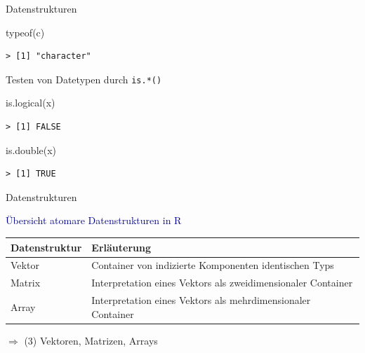 \documentclass[
  8pt,
  ignorenonframetext,
]{beamer}
\newenvironment{Shaded}{\begin{snugshade}}{\end{snugshade}}
\newcommand{\FunctionTok}[1]{\textcolor[rgb]{0.00,0.00,0.00}{#1}}
\newcommand{\NormalTok}[1]{#1}
\begin{document}
\begin{frame}[fragile]{Datenstrukturen}
\begin{Shaded}
\begin{Highlighting}[]
\FunctionTok{typeof}\NormalTok{(c)}
\end{Highlighting}
\end{Shaded}

\begin{verbatim}
> [1] "character"
\end{verbatim}

Testen von Datetypen durch \texttt{is.*()} \vspace{1mm}

\begin{Shaded}
\begin{Highlighting}[]
\FunctionTok{is.logical}\NormalTok{(x)}
\end{Highlighting}
\end{Shaded}

\begin{verbatim}
> [1] FALSE
\end{verbatim}

\begin{Shaded}
\begin{Highlighting}[]
\FunctionTok{is.double}\NormalTok{(x)}
\end{Highlighting}
\end{Shaded}

\begin{verbatim}
> [1] TRUE
\end{verbatim}
\end{frame}

\begin{frame}{Datenstrukturen}
\protect\hypertarget{datenstrukturen-6}{}

\textcolor{darkblue}{Übersicht atomare Datenstrukturen in R}
\vspace{3mm}

\begin{center}
\begin{tabular}{l|l}
Datenstruktur
& Erläuterung
\\\hline

Vektor
& Container von indizierte Komponenten identischen Typs
\\

Matrix
& Interpretation eines Vektors als zweidimensionaler Container
\\

Array
&  Interpretation eines Vektors als mehrdimensionaler Container

\end{tabular}
\end{center}
\vspace{3mm}

\(\Rightarrow\) (3) Vektoren, Matrizen, Arrays
\end{frame}
\end{document}
